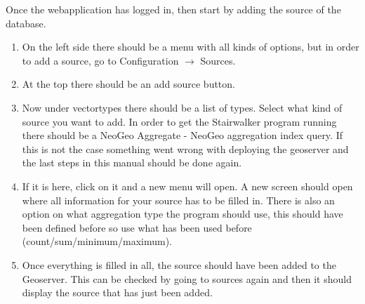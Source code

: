 Once the webapplication has logged in, then start by adding the source of the database. 
\begin{enumerate}
	\item On the left side there should be a menu with all kinds of options, but in order to add a source, go to Configuration $\rightarrow$ Sources. 
	\item At the top there should be an add source button. 
	\item Now under vectortypes there should be a list of types. Select what kind of source you want to add. In order to get the Stairwalker program running there should be a NeoGeo Aggregate - NeoGeo aggregation index query. If this is not the case something went wrong with deploying the geoserver and the last steps in this manual should be done again. 
	\item If it is here, click on it and a new menu will open. A new screen should open where all information for your source has to be filled in. There is also an option on what aggregation type the program should use, this should have been defined before so use what has been used before (count/sum/minimum/maximum). 
	\item Once everything is filled in all, the source should have been added to the Geoserver. This can be checked by going to sources again and then it should display the source that has just been added.
\end{enumerate}